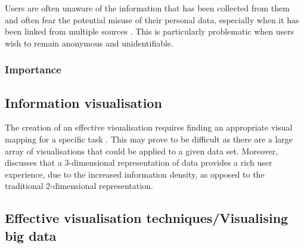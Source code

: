 \documentclass[
	fontsize=11pt
	headlines=2,
	footlines=2,
	parskip=half
]{scrartcl}
\begin{document}
{{{{					Users are often unaware of the information that has been collected from them \citep{katal2013big} and often fear the potential misuse of their personal data, especially when it has been linked from multiple sources \citep{labrinidis2012challenges}. This is particularly problematic when users wish to remain anonymous and unidentifiable.
					
				}
				
			}
				
			\subsubsection{Importance} {			
	
			}
		
		}
		
		\subsection{Information visualisation} {
		
			The creation of an effective visualisation requires finding an appropriate visual mapping for a specific task \citep{rohrer1997web}. This may prove to be difficult as there are a large array of visualisations that could be applied to a given data set. Moreover, \citet{hendley1995case} discusses that a 3-dimensional representation of data provides a rich user experience, due to the increased information density, as opposed to the traditional 2-dimensional representation. 
		
		}
		
		\subsection{Effective visualisation techniques/Visualising big data} {
		
		}
	
	}
	
	\newpage
	
\end{document}
